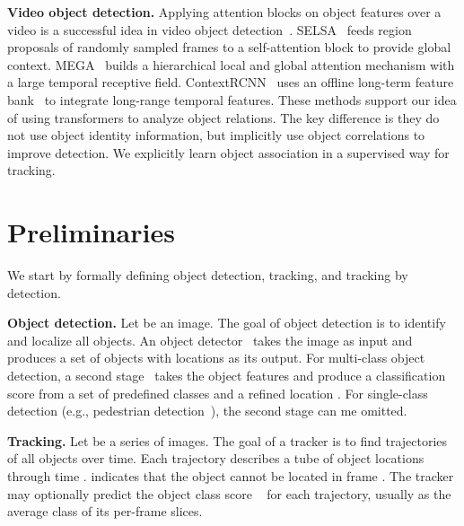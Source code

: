 \documentclass[10pt,twocolumn,letterpaper]{article}
\renewcommand{\paragraph}[1]{\noindent\textbf{#1}}
\begin{document}
\textbf{Video object detection.}
Applying attention blocks on object features over a video is a successful idea in video object detection~\cite{russakovsky2015imagenet}.
SELSA~\cite{wu2019sequence} feeds region proposals of randomly sampled frames to a self-attention block to provide global context.
MEGA~\cite{chen2020memory} builds a hierarchical local and global attention mechanism with a large temporal receptive field.
ContextRCNN~\cite{beery2020context} uses an offline long-term feature bank~\cite{wu2019long} to integrate long-range temporal features.
These methods support our idea of using transformers to analyze object relations.
The key difference is they do not use object identity information, but implicitly use object correlations to improve detection.
We explicitly learn object association in a supervised way for tracking.


\section{Preliminaries}

We start by formally defining object detection, tracking, and tracking by detection.

\paragraph{Object detection.}
Let  be an image.
The goal of object detection is to identify and localize all objects.
An object detector~\cite{zhou2019objects,tian2019fcos,ren2015faster,carion2020end} takes the image  as input and produces a set of objects  with locations  as its output.
For multi-class object detection, a second stage~\cite{ren2015faster,he2017mask} takes the object features and 
produce a classification score  from a set of predefined classes  and a refined location .
For single-class detection (e.g., pedestrian detection~\cite{MOT16}), the second stage can me omitted. 

\paragraph{Tracking.} Let  be a series of images.
The goal of a tracker is to find trajectories  of all objects over time.
Each trajectory  describes a tube of object locations  through time .
 indicates that the object  cannot be located in frame .
The tracker may optionally predict the object class score ~\cite{dave2020tao} for each trajectory, usually as the average class of its per-frame slices.
\end{document}

